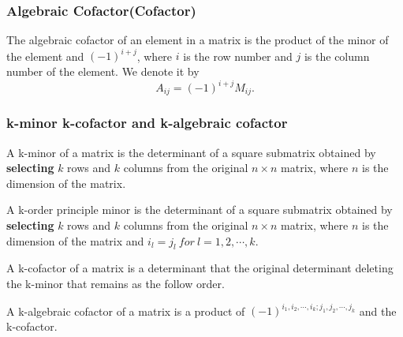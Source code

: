 \documentclass{article}
\theoremstyle{definition}
\begin{document}
\subsubsection{Algebraic Cofactor(Cofactor)}

The algebraic cofactor of an element in a matrix is the product of the minor of the element and 
$(-1)^{i+j}$, where $i$ is the row number and $j$ is the column number of the element. 
We denote it by 
$$A_{ij}=(-1)^{i+j}M_{ij}.$$
\subsubsection{k-minor  k-cofactor and k-algebraic cofactor}

A k-minor of a matrix is the determinant of a 
square submatrix obtained by \textbf{selecting} $k$ 
rows and $k$ columns from the original $n×n$ 
matrix, where $n$ is the dimension of the matrix.

A k-order principle minor is the determinant of a 
square submatrix obtained by \textbf{selecting} $k$
rows and $k$ columns from the original $n×n$
matrix, where $n$ is the dimension of the matrix and 
$i_{l}=j_{l}\ for\ l=1,2,\cdots,k$. 



A k-cofactor of a matrix is a determinant that the original determinant deleting the 
k-minor that remains as the follow order.

A k-algebraic cofactor of a matrix is a product of $(-1)^{i_{1},i_{2},\cdots,i_{k};j_{1},j_{2},\cdots,j_{k}}$
 and the k-cofactor.
\end{document}
